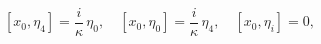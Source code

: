 \begin{equation}\label{10}
  [x_0,\eta_4] = \frac{i}\kappa\, \eta_0, \quad [x_0,\eta_0] = \frac{i}\kappa\, \eta_4, \quad [x_0,\eta_i] = 0,
\end{equation}

